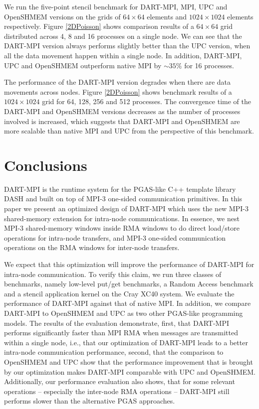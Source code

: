 \documentclass{llncs}
\newcommand{\MPI}[1]{\mbox{MPI-#1}\xspace}
\begin{document}
{We run the five-point stencil benchmark for \mbox{DART-MPI}, MPI, UPC and OpenSHMEM versions 
on the grids of $64 \times 64$ elements and $1024 \times 1024$
elements respectively. Figure \ref{2DPoisson}\protect{} shows comparison results of a $64 \times 64$
grid distributed across 4, 8 and 16 processes on a single node. We can
see that the \mbox{DART-MPI}
version always performs slightly better than the UPC version,
when all the data movement happen within a single node. In addition,
\mbox{DART-MPI}, UPC and OpenSHMEM outperform native MPI by 
$\sim 35\%$ for 16 processes.

The performance of the \mbox{DART-MPI} version degrades when there are data movements across nodes. 
Figure \ref{2DPoisson}\protect{} shows benchmark results
of a $1024 \times 1024$ grid for 64, 128, 256 and 512 processes. The convergence time
of the DART-MPI and OpenSHMEM versions decreases as the 
number of processes involved is increased, which suggests that DART-MPI and OpenSHMEM 
are more scalable than native MPI and UPC from the perspective of this 
benchmark.




\section {Conclusions}
\label {conclusion}
DART-MPI is the runtime system for the PGAS-like C++ template library
DASH and built on top of \MPI3
one-sided communication primitives. In this paper we present an
optimized design of DART-MPI which uses the new \MPI3 shared-memory
extension for intra-node communications. In essence, we nest \MPI3
shared-memory windows inside RMA windows to do direct load/store
operations for intra-node transfers, and
\MPI3 one-sided communication operations on the RMA windows for
inter-node transfers. 

We expect that this optimization will improve the performance of
DART-MPI for intra-node communication. To verify this claim, we run
three classes of benchmarks, namely low-level put/get benchmarks, a
Random Access benchmark and a stencil application kernel
on the Cray XC40 system. We evaluate 
the performance of DART-MPI against that of native MPI. In addition, we compare DART-MPI to
OpenSHMEM and UPC as two other PGAS-like programming
models. The results of the
evaluation demonstrate, 
first, that DART-MPI performs significantly
faster than MPI RMA when messages are transmitted within a single
node, i.e., that our optimization of DART-MPI leads to a better intra-node 
communication performance, second, that the comparison to OpenSHMEM and UPC show that
the performance improvement that is brought by our optimization makes DART-MPI
comparable with UPC and OpenSHMEM. Additionally, our performance evaluation also shows, that for some
relevant operations -- especially the inter-node RMA operations --
DART-MPI still performs slower than the alternative PGAS approaches.

}
\end{document}
